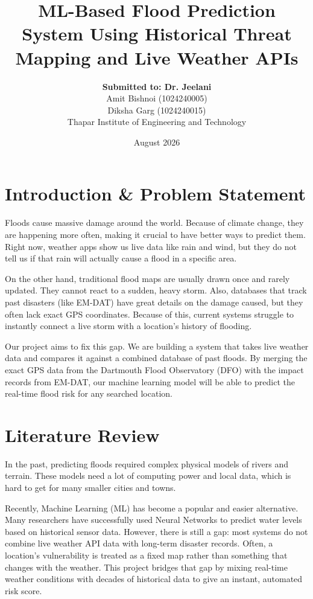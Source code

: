 \documentclass[11pt,a4paper]{article}
\title{\textbf{ML-Based Flood Prediction System Using Historical Threat Mapping and Live Weather APIs}}
\author{
    \textbf{Submitted to: Dr. Jeelani} \\[0.5cm]
    Amit Bishnoi (1024240005) \\
    Diksha Garg (1024240015) \\[0.5cm]
    Thapar Institute of Engineering and Technology
}
\date{August 2026}
\begin{document}
\maketitle

\section{Introduction \& Problem Statement}
Floods cause massive damage around the world. Because of climate change, they are happening more often, making it crucial to have better ways to predict them. Right now, weather apps show us live data like rain and wind, but they do not tell us if that rain will actually cause a flood in a specific area. 

On the other hand, traditional flood maps are usually drawn once and rarely updated. They cannot react to a sudden, heavy storm. Also, databases that track past disasters (like EM-DAT) have great details on the damage caused, but they often lack exact GPS coordinates. Because of this, current systems struggle to instantly connect a live storm with a location's history of flooding.

Our project aims to fix this gap. We are building a system that takes live weather data and compares it against a combined database of past floods. By merging the exact GPS data from the Dartmouth Flood Observatory (DFO) with the impact records from EM-DAT, our machine learning model will be able to predict the real-time flood risk for any searched location.

\section{Literature Review}
In the past, predicting floods required complex physical models of rivers and terrain. These models need a lot of computing power and local data, which is hard to get for many smaller cities and towns. 

Recently, Machine Learning (ML) has become a popular and easier alternative. Many researchers have successfully used Neural Networks to predict water levels based on historical sensor data. However, there is still a gap: most systems do not combine live weather API data with long-term disaster records. Often, a location's vulnerability is treated as a fixed map rather than something that changes with the weather. This project bridges that gap by mixing real-time weather conditions with decades of historical data to give an instant, automated risk score.
\end{document}
